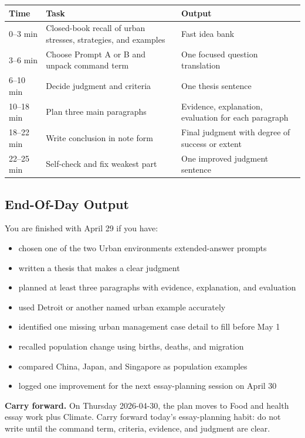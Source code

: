 \documentclass[11pt,a4paper]{article}
\newcommand{\boxnote}[3]{%
\noindent\colorbox{#1}{%
  \begin{minipage}{0.965\textwidth}
  \sffamily
  \textbf{\textcolor{HeadingBlue}{#2}} #3
  \end{minipage}
}}
\begin{document}
\begin{tabularx}{\textwidth}{L{0.15\textwidth}Y Y}
\toprule
\textbf{Time} & \textbf{Task} & \textbf{Output} \\
--3 min & Closed-book recall of urban stresses, strategies, and examples &
Fast idea bank \\
3--6 min & Choose Prompt A or B and unpack command term & One focused question
translation \\
6--10 min & Decide judgment and criteria & One thesis sentence \\
10--18 min & Plan three main paragraphs & Evidence, explanation, evaluation
for each paragraph \\
18--22 min & Write conclusion in note form & Final judgment with degree of
success or extent \\
22--25 min & Self-check and fix weakest part & One improved judgment sentence \\
\bottomrule
\end{tabularx}

\subsection{End-Of-Day Output}

You are finished with April 29 if you have:

\begin{itemize}
  \item chosen one of the two Urban environments extended-answer prompts
  \item written a thesis that makes a clear judgment
  \item planned at least three paragraphs with evidence, explanation, and evaluation
  \item used Detroit or another named urban example accurately
  \item identified one missing urban management case detail to fill before May 1
  \item recalled population change using births, deaths, and migration
  \item compared China, Japan, and Singapore as population examples
  \item logged one improvement for the next essay-planning session on April 30
\end{itemize}

\boxnote{SoftGreen}{Carry forward.}{On Thursday 2026-04-30, the plan moves to
Food and health essay work plus Climate. Carry forward today's essay-planning
habit: do not write until the command term, criteria, evidence, and judgment are
clear.}
\end{document}
